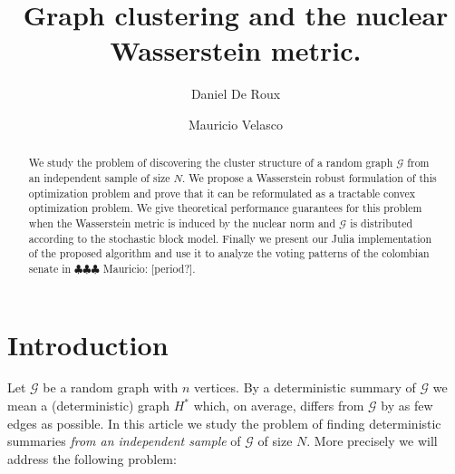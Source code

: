 \documentclass[12pt]{amsart}
\theoremstyle{remark}
\newcommand{\grG}{{\mathcal{G}}}
\newcommand{\mv}[1]{{\color{red} \sf $\clubsuit\clubsuit\clubsuit$ Mauricio: [#1]}}
\begin{document}
\author{Daniel De Roux}
\address{
Departamento de matem\'aticas\\
Universidad de los Andes\\
Carrera $1^{\rm ra}\#18A-12$\\ 
Bogot\'a, Colombia
}

\author{Mauricio Velasco}
\address{
Departamento de matem\'aticas\\
Universidad de los Andes\\
Carrera $1^{\rm ra}\#18A-12$\\ 
Bogot\'a, Colombia
}


\begin{abstract} We study the problem of discovering the cluster structure of a random graph $\grG$ from an independent sample of size $N$. We propose a Wasserstein robust formulation of this optimization problem and prove that it can be reformulated as a tractable convex optimization problem. We give theoretical performance guarantees for this problem when the Wasserstein metric is induced by the nuclear norm and $\grG$ is distributed according to the stochastic block model. Finally we present our Julia implementation of the proposed algorithm and use it to analyze the voting patterns of the colombian senate in \mv{period?}.
\end{abstract} 

\title{Graph clustering and the nuclear Wasserstein metric.}
\maketitle

\section{Introduction}



Let $\grG$ be a random graph with $n$ vertices. By a deterministic summary of $\grG$ we mean a (deterministic) graph $H^*$ which, on average, differs from $\grG$ by as few edges as possible. In this article we study the problem of finding deterministic summaries {\it from an independent sample} of $\grG$ of size $N$. More precisely we will address the following problem:
\end{document}
